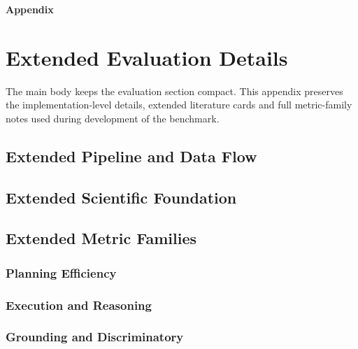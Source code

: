 
\clearpage
\begin{center}
    {\Huge \textbf{Appendix}}
\end{center}
\vspace{1cm}

\section{Extended Evaluation Details}
\label{app:extended-evaluation}

The main body keeps the evaluation section compact. This appendix preserves the
implementation-level details, extended literature cards and full metric-family
notes used during development of the benchmark.

\subsection{Extended Pipeline and Data Flow}
\label{app:extended-pipeline}


\clearpage
\subsection{Extended Scientific Foundation}
\label{app:extended-scientific-foundation}


\clearpage
\subsection{Extended Metric Families}
\label{app:extended-metric-families}

\subsubsection{Planning Efficiency}


\clearpage
\subsubsection{Execution and Reasoning}


\clearpage
\subsubsection{Grounding and Discriminatory}



